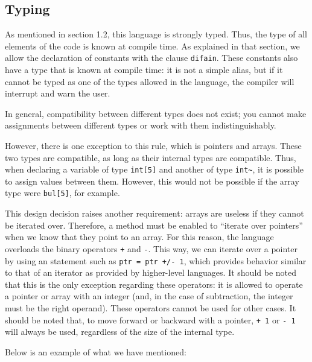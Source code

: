 \documentclass[10pt,a4paper]{article}
\begin{document}
\subsection{Typing}
\label{subsec:Tipado}
As mentioned in section 1.2, this language is strongly typed. Thus, the type of all elements of the code is known at compile time. As explained in that section, we allow the declaration of constants with the clause \texttt{\color{blue}difain}. These constants also have a type that is known at compile time: it is not a simple alias, but if it cannot be typed as one of the types allowed in the language, the compiler will interrupt and warn the user.

In general, compatibility between different types does not exist; you cannot make assignments between different types or work with them indistinguishably.

However, there is one exception to this rule, which is pointers and arrays. These two types are compatible, as long as their internal types are compatible. Thus, when declaring a variable of type \texttt{\color{blue}int[5]} and another of type \texttt{\color{blue}int\~}, it is possible to assign values between them. However, this would not be possible if the array type were \texttt{\color{blue}bul[5]}, for example.

This design decision raises another requirement: arrays are useless if they cannot be iterated over. Therefore, a method must be enabled to “iterate over pointers” when we know that they point to an array. For this reason, the language overloads the binary operators \texttt{\color{blue}+} and \texttt{\color{blue}-}. This way, we can iterate over a pointer by using an statement such as \texttt{\color{blue}ptr = ptr +/- 1}, which provides behavior similar to that of an iterator as provided by higher-level languages. It should be noted that this is the only exception regarding these operators: it is allowed to operate a pointer or array with an integer (and, in the case of subtraction, the integer must be the right operand). These operators cannot be used for other cases. It should be noted that, to move forward or backward with a pointer, \texttt{\color{blue}+ 1} or \texttt{\color{blue}- 1} will always be used, regardless of the size of the internal type.

Below is an example of what we have mentioned:


\end{document}

